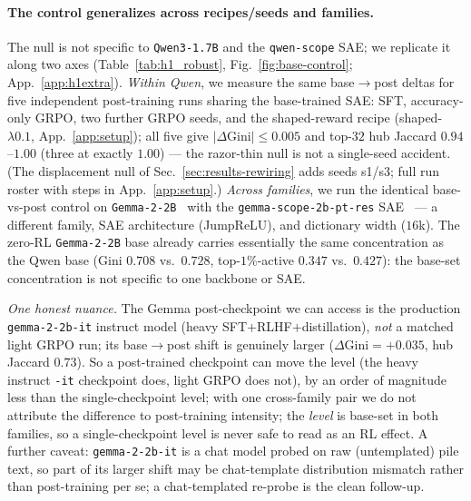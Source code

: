 \documentclass{article}
\begin{document}
\paragraph{The control generalizes across recipes/seeds and families.} The null is not specific to \texttt{Qwen3-1.7B} and the \texttt{qwen-scope} SAE; we replicate it along two axes (Table~\ref{tab:h1_robust}, Fig.~\ref{fig:base-control}; App.~\ref{app:h1extra}). \emph{Within Qwen}, we measure the same base$\to$post deltas for five independent post-training runs sharing the base-trained SAE: SFT, accuracy-only GRPO, two further GRPO seeds, and the shaped-reward recipe (shaped-$\lambda0.1$, App.~\ref{app:setup}); all five give $|\Delta\text{Gini}|\le 0.005$ and top-$32$ hub Jaccard $0.94$--$1.00$ (three at exactly $1.00$) --- the razor-thin null is not a single-seed accident. (The displacement null of Sec.~\ref{sec:results-rewiring} adds seeds s1/s3; full run roster with steps in App.~\ref{app:setup}.) \emph{Across families}, we run the identical base-vs-post control on \texttt{Gemma-2-2B}~\citep{gemmateam2024gemma2} with the \texttt{gemma-scope-2b-pt-res} SAE~\citep{lieberum2024gemmascope} --- a different family, SAE architecture (JumpReLU), and dictionary width ($16$k). The zero-RL \texttt{Gemma-2-2B} base already carries essentially the same concentration as the Qwen base (Gini $0.708$ vs.\ $0.728$, top-$1\%$-active $0.347$ vs.\ $0.427$): the base-set concentration is not specific to one backbone or SAE.

\emph{One honest nuance.} The Gemma post-checkpoint we can access is the production \texttt{gemma-2-2b-it} instruct model (heavy SFT$+$RLHF$+$distillation), \emph{not} a matched light GRPO run; its base$\to$post shift is genuinely larger ($\Delta\text{Gini}=+0.035$, hub Jaccard $0.73$). So a post-trained checkpoint can move the level (the heavy instruct \texttt{-it} checkpoint does, light GRPO does not), by an order of magnitude less than the single-checkpoint level; with one cross-family pair we do not attribute the difference to post-training intensity; the \emph{level} is base-set in both families, so a single-checkpoint level is never safe to read as an RL effect. A further caveat: \texttt{gemma-2-2b-it} is a chat model probed on raw (untemplated) pile text, so part of its larger shift may be chat-template distribution mismatch rather than post-training per se; a chat-templated re-probe is the clean follow-up.
\end{document}
